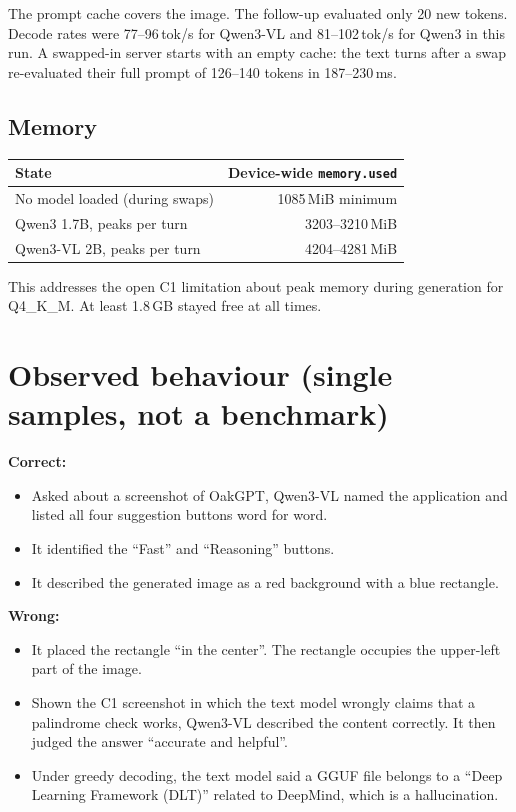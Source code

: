 \documentclass[11pt,a4paper]{article}
\newcommand{\code}[1]{\texttt{#1}}
\begin{document}
The prompt cache covers the image. The follow-up evaluated only 20 new tokens. Decode
rates were 77--96\,tok/s for Qwen3-VL and 81--102\,tok/s for Qwen3 in this run. A
swapped-in server starts with an empty cache: the text turns after a swap re-evaluated
their full prompt of 126--140 tokens in 187--230\,ms.

\subsection{Memory}

\begin{center}
\small
\begin{tabular}{@{}lr@{}}
\toprule
State & Device-wide \code{memory.used} \\
\midrule
No model loaded (during swaps) & 1085\,MiB minimum \\
Qwen3 1.7B, peaks per turn & 3203--3210\,MiB \\
Qwen3-VL 2B, peaks per turn & 4204--4281\,MiB \\
\bottomrule
\end{tabular}
\end{center}

This addresses the open C1 limitation about peak memory during generation for
Q4\_K\_M. At least 1.8\,GB stayed free at all times.

\section{Observed behaviour (single samples, not a benchmark)}\label{sec:observed}

\textbf{Correct:}
\begin{itemize}
  \item Asked about a screenshot of OakGPT, Qwen3-VL named the application and listed all
        four suggestion buttons word for word.
  \item It identified the ``Fast'' and ``Reasoning'' buttons.
  \item It described the generated image as a red background with a blue rectangle.
\end{itemize}

\textbf{Wrong:}
\begin{itemize}
  \item It placed the rectangle ``in the center''. The rectangle occupies the upper-left
        part of the image.
  \item Shown the C1 screenshot in which the text model wrongly claims that a palindrome
        check works, Qwen3-VL described the content correctly. It then judged the answer
        ``accurate and helpful''.
  \item Under greedy decoding, the text model said a GGUF file belongs to a ``Deep
        Learning Framework (DLT)'' related to DeepMind, which is a hallucination.
\end{itemize}
\end{document}
